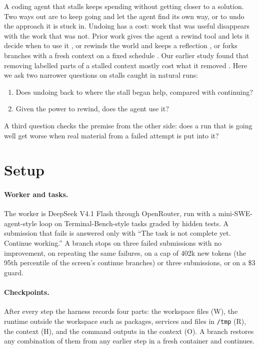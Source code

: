 \documentclass{article}
\begin{document}
A coding agent that stalls keeps spending without getting closer to a solution. Two ways out are to keep going and
let the agent find its own way, or to undo the approach it is stuck in. Undoing has a cost: work that was useful
disappears with the work that was not. Prior work gives the agent a rewind tool and lets it decide when to use it
\cite{zhuang2026agentrewind}, or rewinds the world and keeps a reflection \cite{yu2026rir}, or forks branches with a
fresh context on a fixed schedule \cite{cai2026forkflush}. Our earlier study found that removing labelled parts of a
stalled context mostly cost what it removed \cite{srinivasan2026exp48}. Here we ask two narrower questions on stalls
caught in natural runs:
\begin{enumerate}[leftmargin=*,itemsep=1pt,topsep=2pt]
  \item Does undoing back to where the stall began help, compared with continuing?
  \item Given the power to rewind, does the agent use it?
\end{enumerate}
A third question checks the premise from the other side: does a run that is going well get worse when real material
from a failed attempt is put into it?

\section{Setup}
\label{sec:setup}

\paragraph{Worker and tasks.} The worker is DeepSeek V4.1 Flash through OpenRouter, run with a mini-SWE-agent-style
loop \cite{miniswe2026} on Terminal-Bench-style tasks \cite{merrill2026terminalbench} graded by hidden tests. A
submission that fails is answered only with ``The task is not complete yet. Continue working.'' A branch stops on
three failed submissions with no improvement, on repeating the same failures, on a cap of 402k new tokens (the 95th
percentile of the screen's continue branches) or three submissions, or on a \$3 guard.

\paragraph{Checkpoints.} After every step the harness records four parts: the workspace files (W), the runtime outside
the workspace such as packages, services and files in \texttt{/tmp} (R), the context (H), and the command outputs in the
context (O). A branch restores any combination of them from any earlier step in a fresh container and continues.
\end{document}
